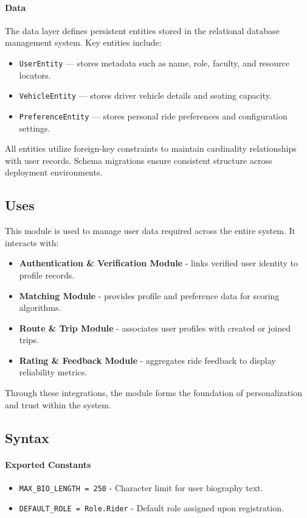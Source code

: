 \paragraph{Data}
The data layer defines persistent entities stored in the relational database management system. 
Key entities include:
\begin{itemize}
    \item \texttt{UserEntity} --- stores metadata such as name, role, faculty, and resource locators.
    \item \texttt{VehicleEntity} --- stores driver vehicle details and seating capacity.
    \item \texttt{PreferenceEntity} --- stores personal ride preferences and configuration settings.
\end{itemize}
All entities utilize foreign-key constraints to maintain cardinality relationships with user records. 
Schema migrations ensure consistent structure across deployment environments.

\subsection{Uses}
This module is used to manage user data required across the entire system. 
It interacts with:
\begin{itemize}
    \item \textbf{Authentication \& Verification Module} - links verified user identity to profile records.
    \item \textbf{Matching Module} - provides profile and preference data for scoring algorithms.
    \item \textbf{Route \& Trip Module} - associates user profiles with created or joined trips.
    \item \textbf{Rating \& Feedback Module} - aggregates ride feedback to display reliability metrics.
\end{itemize}
Through these integrations, the module forms the foundation of personalization and trust within the system.

\subsection{Syntax}

\paragraph{Exported Constants}
\begin{itemize}
    \item \texttt{MAX\_BIO\_LENGTH = 250} - Character limit for user biography text.
    \item \texttt{DEFAULT\_ROLE = Role.Rider} - Default role assigned upon registration.
\end{itemize}

